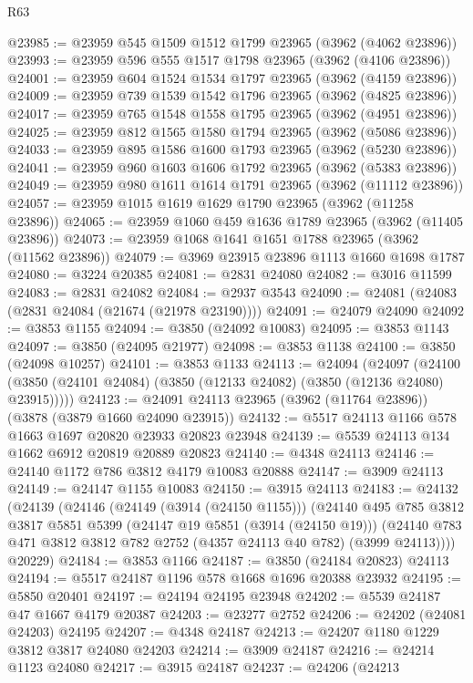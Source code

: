 \begin{lexlean}{R63}
\begin{coremodule}
@23985 := @23959 @545 @1509 @1512 @1799 @23965 (@3962 (@4062 @23896))
@23993 := @23959 @596 @555 @1517 @1798 @23965 (@3962 (@4106 @23896))
@24001 := @23959 @604 @1524 @1534 @1797 @23965 (@3962 (@4159 @23896))
@24009 := @23959 @739 @1539 @1542 @1796 @23965 (@3962 (@4825 @23896))
@24017 := @23959 @765 @1548 @1558 @1795 @23965 (@3962 (@4951 @23896))
@24025 := @23959 @812 @1565 @1580 @1794 @23965 (@3962 (@5086 @23896))
@24033 := @23959 @895 @1586 @1600 @1793 @23965 (@3962 (@5230 @23896))
@24041 := @23959 @960 @1603 @1606 @1792 @23965 (@3962 (@5383 @23896))
@24049 := @23959 @980 @1611 @1614 @1791 @23965 (@3962 (@11112 @23896))
@24057 := @23959 @1015 @1619 @1629 @1790 @23965 (@3962 (@11258 @23896))
@24065 := @23959 @1060 @459 @1636 @1789 @23965 (@3962 (@11405 @23896))
@24073 := @23959 @1068 @1641 @1651 @1788 @23965 (@3962 (@11562 @23896))
@24079 := @3969 @23915 @23896 @1113 @1660 @1698 @1787
@24080 := @3224 @20385
@24081 := @2831 @24080
@24082 := @3016 @11599
@24083 := @2831 @24082
@24084 := @2937 @3543
@24090 := @24081 (@24083 (@2831 @24084 (@21674 (@21978 @23190))))
@24091 := @24079 @24090
@24092 := @3853 @1155
@24094 := @3850 (@24092 @10083)
@24095 := @3853 @1143
@24097 := @3850 (@24095 @21977)
@24098 := @3853 @1138
@24100 := @3850 (@24098 @10257)
@24101 := @3853 @1133
@24113 := @24094
    (@24097 (@24100 (@3850 (@24101 @24084) (@3850 (@12133 @24082) (@3850 (@12136 @24080) @23915)))))
@24123 := @24091 @24113 @23965 (@3962 (@11764 @23896)) (@3878 (@3879 @1660 @24090 @23915))
@24132 := @5517 @24113 @1166 @578 @1663 @1697 @20820 @23933 @20823 @23948
@24139 := @5539 @24113 @134 @1662 @6912 @20819 @20889 @20823
@24140 := @4348 @24113
@24146 := @24140 @1172 @786 @3812 @4179 @10083 @20888
@24147 := @3909 @24113
@24149 := @24147 @1155 @10083
@24150 := @3915 @24113
@24183 := @24132
    (@24139
      (@24146
        (@24149 (@3914 (@24150 @1155)))
        (@24140
          @495
          @785
          @3812
          @3817
          @5851
          @5399
          (@24147 @19 @5851 (@3914 (@24150 @19)))
          (@24140 @783 @471 @3812 @3812 @782 @2752 (@4357 @24113 @40 @782) (@3999 @24113))))
      @20229)
@24184 := @3853 @1166
@24187 := @3850 (@24184 @20823) @24113
@24194 := @5517 @24187 @1196 @578 @1668 @1696 @20388 @23932
@24195 := @5850 @20401
@24197 := @24194 @24195 @23948
@24202 := @5539 @24187 @47 @1667 @4179 @20387
@24203 := @23277 @2752
@24206 := @24202 (@24081 @24203) @24195
@24207 := @4348 @24187
@24213 := @24207 @1180 @1229 @3812 @3817 @24080 @24203
@24214 := @3909 @24187
@24216 := @24214 @1123 @24080
@24217 := @3915 @24187
@24237 := @24206
    (@24213

\end{coremodule}
\end{lexlean}

